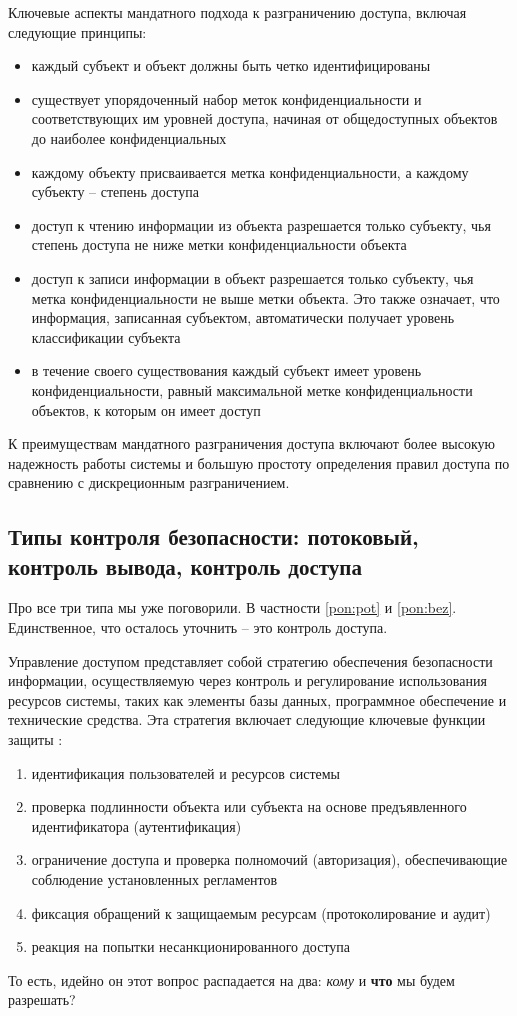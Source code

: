 Ключевые аспекты мандатного подхода к разграничению доступа, включая следующие принципы:
\begin{itemize}
	\item каждый субъект и объект должны быть четко идентифицированы
	\item существует упорядоченный набор меток конфиденциальности и соответствующих им уровней доступа, начиная от общедоступных объектов до наиболее конфиденциальных
	\item каждому объекту присваивается метка конфиденциальности, а каждому субъекту – степень доступа
	\item доступ к чтению информации из объекта разрешается только субъекту, чья степень доступа не ниже метки конфиденциальности объекта
	\item доступ к записи информации в объект разрешается только субъекту, чья метка конфиденциальности не выше метки объекта. Это также означает, что информация, записанная субъектом, автоматически получает уровень классификации субъекта
	\item в течение своего существования каждый субъект имеет уровень конфиденциальности, равный максимальной метке конфиденциальности объектов, к которым он имеет доступ
\end{itemize}

К преимуществам мандатного разграничения доступа включают более высокую надежность работы системы и большую простоту определения правил доступа по сравнению с дискреционным разграничением.

\subsection{Типы контроля безопасности: потоковый, контроль вывода, контроль доступа}
Про все три типа мы уже поговорили. В частности \ref{pon:pot} и \ref{pon:bez}. Единственное, что осталось уточнить -- это контроль доступа. 

Управление доступом представляет собой стратегию обеспечения безопасности информации, осуществляемую через контроль и регулирование использования ресурсов системы, таких как элементы базы данных, программное обеспечение и технические средства. Эта стратегия включает следующие ключевые функции защиты \autocite[с. 36]{Skakun}:
\begin{enumerate}
	\item идентификация пользователей и ресурсов системы
	\item проверка подлинности объекта или субъекта на основе предъявленного идентификатора (аутентификация)
	\item ограничение доступа и проверка полномочий (авторизация), обеспечивающие соблюдение установленных регламентов
	\item фиксация обращений к защищаемым ресурсам (протоколирование и аудит)
	\item реакция на попытки несанкционированного доступа
\end{enumerate}
То есть, идейно он этот вопрос распадается на два: \textit{кому} и \textbf{что} мы будем разрешать?

